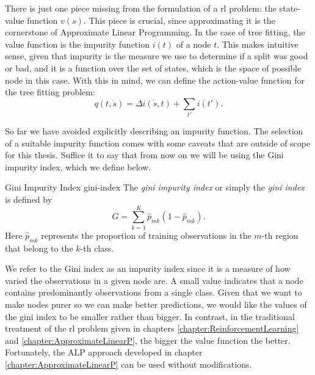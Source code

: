 There is just one piece missing from the formulation of a \ac{rl} problem: the
state-value function $v(s)$. This piece is crucial, since approximating it is
the cornerstone of Approximate Linear Programming. In the case of tree fitting,
the value function is the impurity function $i(t)$ of a node $t$. This makes
intuitive sense, given that impurity is the measure we use to determine if a
split was good or bad, and it is a function over the set of states, which is the
space of possible node in this case. With this in mind, we can define the
action-value function for the tree fitting problem:
\begin{equation}
    q (t, \dot{s}) = \Delta i(\dot{s}, t) + \sum_{t'} i (t').
\end{equation}

So far we have avoided explicitly describing an impurity function. The selection of a suitable impurity function comes with some caveats that are outside of scope for this thesis. Suffice it to say that from now on we will be using the Gini impurity index, which we define below.

\begin{dfn}{Gini Impurity Index \cite[Ch.~8.1.2]{intro2statslearning} }{gini-index}
    The \emph{gini impurity index} or simply the \emph{gini index} is defined by
    \begin{equation}
        G = \sum_{k=1}^{K} \widehat{p}_{mk}(1 - \widehat{p}_{mk}).
    \end{equation}
    Here $\widehat{p}_{mk}$ represents the proportion of training observations in the $m$-th region that belong to the $k$-th class.
\end{dfn}

We refer to the Gini index as an impurity index since it is a measure of how
varied the observations in a given node are. A small value indicates that a node
contains predominantly observations from a single class. Given that we want to
make nodes purer so we can make better predictions, we would like the values of
the gini index to be smaller rather than bigger. In contrast, in the traditional
treatment of the \ac{rl} problem given in chapters
\ref{chapter:ReinforcementLearning} and \ref{chapter:ApproximateLinearP}, the
bigger the value function the better. Fortunately, the ALP approach developed in
chapter \ref{chapter:ApproximateLinearP} can be used without modifications.



